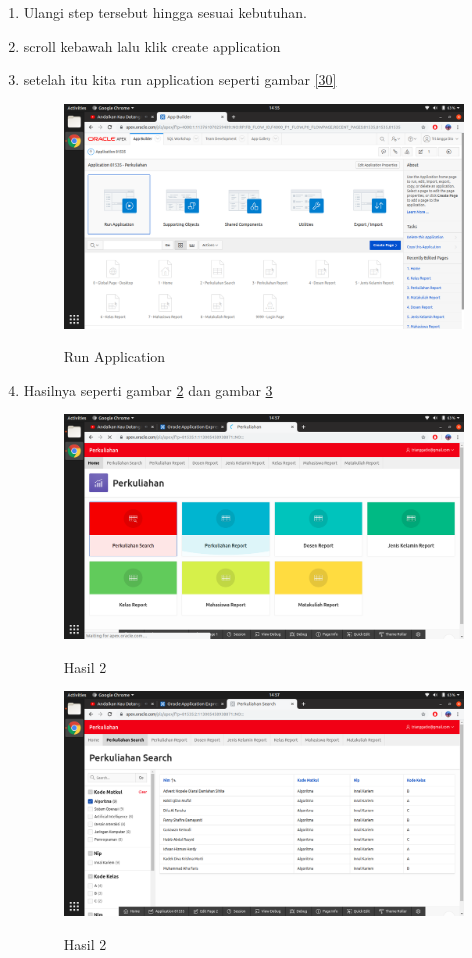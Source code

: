 \begin{enumerate}
\item Ulangi step tersebut hingga sesuai kebutuhan.

\item scroll kebawah lalu klik create application

\item setelah itu kita run application seperti gambar \ref{30}
\begin{figure}[H]
\centering
\caption{Run Application}
\includegraphics[width=1\textwidth]{figures/31}
\label{31}
\end{figure}

\item Hasilnya seperti gambar \ref{32} dan gambar \ref{33}
\begin{figure}[H]
\centering
\caption{Hasil 2}
\includegraphics[width=1\textwidth]{figures/32}
\label{32}
\end{figure}

\begin{figure}[H]
\centering
\caption{Hasil 2}
\includegraphics[width=1\textwidth]{figures/33}
\label{33}
\end{figure}

\end{enumerate}